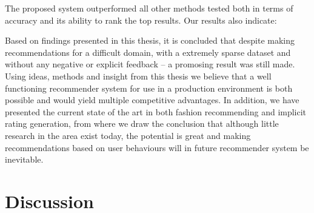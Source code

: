 The proposed system outperformed all other methods tested both in terms of
accuracy and its ability to rank the top results. Our results also indicate:

Based on findings presented in this thesis, it is concluded that despite making
recommendations for a difficult domain, with a extremely sparse dataset and
without any negative or explicit feedback -- a promosing result was still made.
Using ideas, methods and insight from this thesis we believe that a well
functioning recommender system for use in a production environment is both
possible and would yield multiple competitive advantages. In addition, we have
presented the current state of the art in both fashion recommending and
implicit rating generation, from where we draw the conclusion that although
little research in the area exist today, the potential is great and making
recommendations based on user behaviours will in future recommender system be
inevitable.

%

\section{Discussion}

